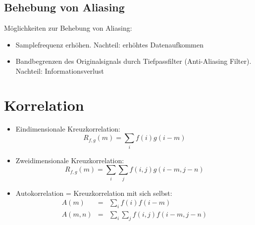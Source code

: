 \subsection{Behebung von Aliasing}
Möglichkeiten zur Behebung von Aliasing:
\begin{itemize}
\item Samplefrequenz erhöhen. Nachteil: erhöhtes Datenaufkommen
\item Bandbegrenzen des Originalsignals durch Tiefpassfilter (Anti-Aliasing Filter). Nachteil: Informationsverlust
\end{itemize}

\section{Korrelation}
\begin{itemize}
\item Eindimensionale Kreuzkorrelation: $$R_{f,g}(m) = \sum\limits_{i} f(i) g(i - m)$$
\item Zweidimensionale Kreuzkorrelation: $$R_{f,g}(m) = \sum\limits_i \sum\limits_j f(i,j) g(i-m,j-n)$$
\item Autokorrelation = Kreuzkorrelation mit sich selbst:
\begin{eqnarray*}
A(m) &=& \sum\limits_i f(i) f(i-m) \\ A(m,n) &=& \sum\limits_i \sum\limits_j f(i,j) f(i-m,j-n)
\end{eqnarray*}
\end{itemize}
